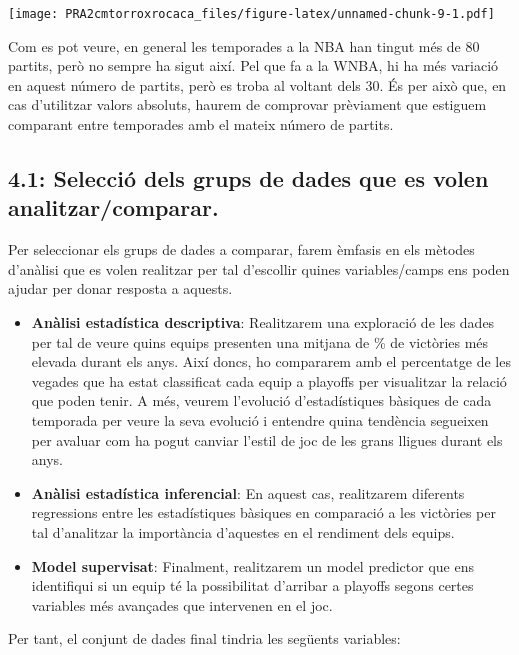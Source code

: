 \documentclass[
]{article}
\begin{document}
\texttt{[image: PRA2cmtorroxrocaca\_files/figure-latex/unnamed-chunk-9-1.pdf]}

Com es pot veure, en general les temporades a la NBA han tingut més de
80 partits, però no sempre ha sigut així. Pel que fa a la WNBA, hi ha
més variació en aquest número de partits, però es troba al voltant dels
30. És per això que, en cas d'utilitzar valors absoluts, haurem de
comprovar prèviament que estiguem comparant entre temporades amb el
mateix número de partits.

\hypertarget{selecciuxf3-dels-grups-de-dades-que-es-volen-analitzarcomparar.}{%
\subsection{4.1: Selecció dels grups de dades que es volen
analitzar/comparar.}\label{selecciuxf3-dels-grups-de-dades-que-es-volen-analitzarcomparar.}}

Per seleccionar els grups de dades a comparar, farem èmfasis en els
mètodes d'anàlisi que es volen realitzar per tal d'escollir quines
variables/camps ens poden ajudar per donar resposta a aquests.

\begin{itemize}
\item
  \textbf{Anàlisi estadística descriptiva}: Realitzarem una exploració
  de les dades per tal de veure quins equips presenten una mitjana de \%
  de victòries més elevada durant els anys. Així doncs, ho compararem
  amb el percentatge de les vegades que ha estat classificat cada equip
  a playoffs per visualitzar la relació que poden tenir. A més, veurem
  l'evolució d'estadístiques bàsiques de cada temporada per veure la
  seva evolució i entendre quina tendència segueixen per avaluar com ha
  pogut canviar l'estil de joc de les grans lligues durant els anys.
\item
  \textbf{Anàlisi estadística inferencial}: En aquest cas, realitzarem
  diferents regressions entre les estadístiques bàsiques en comparació a
  les victòries per tal d'analitzar la importància d'aquestes en el
  rendiment dels equips.
\item
  \textbf{Model supervisat}: Finalment, realitzarem un model predictor
  que ens identifiqui si un equip té la possibilitat d'arribar a
  playoffs segons certes variables més avançades que intervenen en el
  joc.
\end{itemize}

Per tant, el conjunt de dades final tindria les següents variables:
\end{document}
